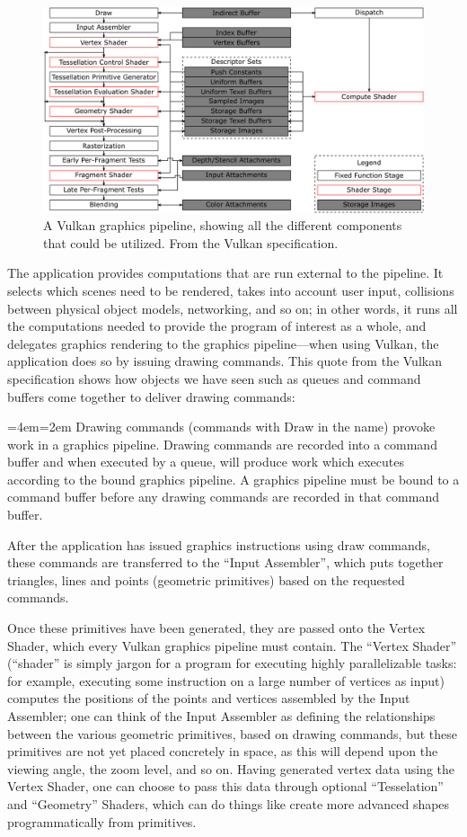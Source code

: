\documentclass[12pt,letterpaper]{article}
\newcommand{\inquotes}[1]{``#1''}	%
\newenvironment{indenttext}{%
	\par%
	\medskip
	\leftskip=4em\rightskip=2em%
	\noindent\ignorespaces}{%
	\par\medskip}
\renewenvironment{quotation}{\begin{indenttext}\fontfamily{LinuxLibertineT-OsF}\selectfont}{\end{indenttext}}
\begin{document}
    \begin{figure}
        \centering
        \includegraphics[width=0.7\linewidth]{vulkan-graphics-pipeline}
        \caption{A Vulkan graphics pipeline, showing all the different components that could be utilized. From the Vulkan specification.}
        \label{fig:vulkan-graphics-pipeline}
    \end{figure}
    
    The application provides computations that are run external to the pipeline. It selects which scenes need to be rendered, takes into account user input, collisions between physical object models, networking, and so on; in other words, it runs all the computations needed to provide the program of interest as a whole, and delegates graphics rendering to the graphics pipeline---when using Vulkan, the application does so by issuing drawing commands. This quote from the Vulkan specification shows how objects we have seen such as queues and command buffers come together to deliver drawing commands: 
        \begin{quotation}
            Drawing commands (commands with Draw in the name) provoke work in a graphics pipeline. Drawing commands are recorded into a command buffer and when executed by a queue, will produce work which executes according to the bound graphics pipeline. A graphics pipeline must be bound to a command buffer before any drawing commands are recorded in that command buffer.
        \end{quotation}
    After the application has issued graphics instructions using draw commands, these commands are transferred to the \inquotes{Input Assembler}, which puts together triangles, lines and points (geometric primitives) based on the requested commands. 

    Once these primitives have been generated, they are passed onto the Vertex Shader, which every Vulkan graphics pipeline must contain. The \inquotes{Vertex Shader} (\inquotes{shader} is simply jargon for a program for executing highly parallelizable tasks: for example, executing some instruction on a large number of vertices as input) computes the positions of the points and vertices assembled by the Input Assembler; one can think of the Input Assembler as defining the relationships between the various geometric primitives, based on drawing commands, but these primitives are not yet placed concretely in space, as this will depend upon the viewing angle, the zoom level, and so on. Having generated vertex data using the Vertex Shader, one can choose to pass this data through optional \inquotes{Tesselation} and \inquotes{Geometry} Shaders, which can do things like create more advanced shapes programmatically from primitives. 
\end{document}
